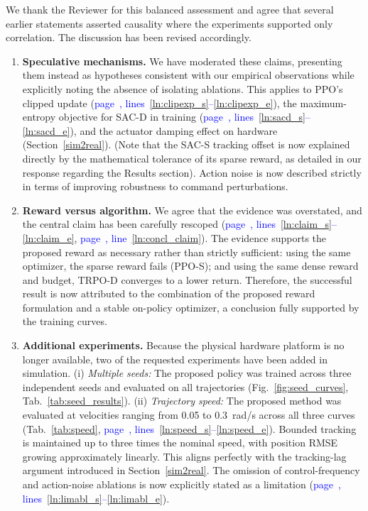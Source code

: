 \documentclass[11pt]{elsarticle}
\newcommand{\mline}[1]{\textcolor{blue}{page~\pageref{#1}, line~\ref{#1}}}
\newcommand{\mlines}[2]{\textcolor{blue}{page~\pageref{#1}, lines~\ref{#1}--\ref{#2}}}
\begin{document}
\begin{responsebox}
We thank the Reviewer for this balanced assessment and agree that several earlier statements asserted causality where the experiments supported only correlation. The discussion has been revised accordingly.

\begin{enumerate}
\item \textbf{Speculative mechanisms.} We have moderated these claims, presenting them instead as hypotheses consistent with our empirical observations while explicitly noting the absence of isolating ablations. This applies to PPO's clipped update (\mlines{ln:clipexp_s}{ln:clipexp_e}), the maximum-entropy objective for SAC-D in training (\mlines{ln:sacd_s}{ln:sacd_e}), and the actuator damping effect on hardware (Section~\ref{sim2real}). (Note that the SAC-S tracking offset is now explained directly by the mathematical tolerance of its sparse reward, as detailed in our response regarding the Results section). Action noise is now described strictly in terms of improving robustness to command perturbations.

\item \textbf{Reward versus algorithm.} We agree that the evidence was overstated, and the central claim has been carefully rescoped (\mlines{ln:claim_s}{ln:claim_e}, \mline{ln:concl_claim}). The evidence supports the proposed reward as necessary rather than strictly sufficient: using the same optimizer, the sparse reward fails (PPO-S); and using the same dense reward and budget, TRPO-D converges to a lower return. Therefore, the successful result is now attributed to the combination of the proposed reward formulation and a stable on-policy optimizer, a conclusion fully supported by the training curves.

\item \textbf{Additional experiments.} Because the physical hardware platform is no longer available, two of the requested experiments have been added in simulation. (i) \emph{Multiple seeds:} The proposed policy was trained across three independent seeds and evaluated on all trajectories (Fig.~\ref{fig:seed_curves}, Tab.~\ref{tab:seed_results}). (ii) \emph{Trajectory speed:} The proposed method was evaluated at velocities ranging from 0.05 to 0.3~rad/s across all three curves (Tab.~\ref{tab:speed}, \mlines{ln:speed_s}{ln:speed_e}). Bounded tracking is maintained up to three times the nominal speed, with position RMSE growing approximately linearly. This aligns perfectly with the tracking-lag argument introduced in Section~\ref{sim2real}. The omission of control-frequency and action-noise ablations is now explicitly stated as a limitation (\mlines{ln:limabl_s}{ln:limabl_e}).
\end{enumerate}
\end{responsebox}
\end{document}
